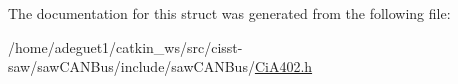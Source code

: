 The documentation for this struct was generated from the following file\-:\begin{DoxyCompactItemize}
\item 
/home/adeguet1/catkin\-\_\-ws/src/cisst-\/saw/saw\-C\-A\-N\-Bus/include/saw\-C\-A\-N\-Bus/\hyperlink{_ci_a402_8h}{Ci\-A402.\-h}\end{DoxyCompactItemize}
